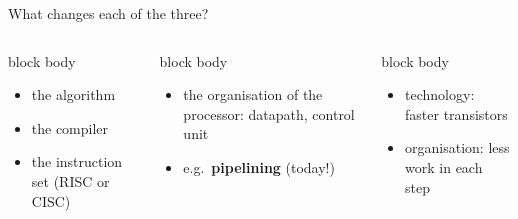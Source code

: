 \documentclass[aspectratio=169,10pt]{beamer}
\begin{document}
\begin{frame}{What changes each of the three?}
  \begin{columns}[T,onlytextwidth]
      \begin{beamercolorbox}[rounded=true,sep=0.15cm,wd=\linewidth]{block body}
        \centering{\small\textbf{\textcolor{sViolet}{IC}}}\\[0.05cm]
        {\Large\textcolor{sViolet}{\faCode}}\par
        \footnotesize\raggedright
        \begin{itemize}\setlength{\itemsep}{2pt}
          \item the algorithm
          \item the compiler
          \item the instruction set (RISC or CISC)
        \end{itemize}
      \end{beamercolorbox}
      \begin{beamercolorbox}[rounded=true,sep=0.15cm,wd=\linewidth]{block body}
        \centering{\small\textbf{\textcolor{sPinkText}{CPI}}}\\[0.05cm]
        {\Large\textcolor{sPink}{\faProjectDiagram}}\par
        \footnotesize\raggedright
        \begin{itemize}\setlength{\itemsep}{2pt}
          \item the organisation of the processor: datapath, control unit
          \item e.g.\ \textbf{pipelining} (today!)
        \end{itemize}
      \end{beamercolorbox}
      \begin{beamercolorbox}[rounded=true,sep=0.15cm,wd=\linewidth]{block body}
        \centering{\small\textbf{\textcolor{sAmberText}{Clock rate}}}\\[0.05cm]
        {\Large\textcolor{sAmber}{\faBolt}}\par
        \footnotesize\raggedright
        \begin{itemize}\setlength{\itemsep}{2pt}
          \item technology: faster transistors
          \item organisation: less work in each step
        \end{itemize}
      \end{beamercolorbox}
  \end{columns}
\end{frame}
\end{document}
